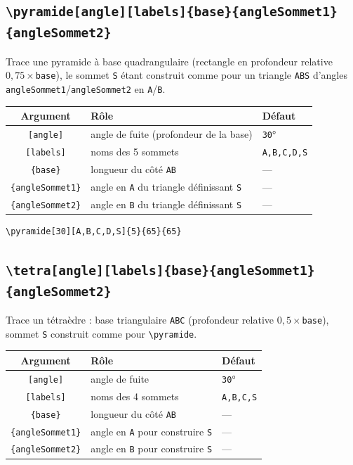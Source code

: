 \documentclass[11pt,a4paper]{article}
\newcommand{\cmdname}[1]{\texttt{\textbackslash#1}}
\begin{document}
\subsection{\cmdname{pyramide[angle][labels]\{base\}\{angleSommet1\}\{angleSommet2\}}}

Trace une pyramide à base quadrangulaire (rectangle en profondeur relative $0{,}75\times$\texttt{base}), le sommet \texttt{S} étant construit comme pour un triangle \texttt{ABS} d'angles \texttt{angleSommet1}/\texttt{angleSommet2} en \texttt{A}/\texttt{B}.

\begin{center}
\begin{tabular}{@{}cll@{}}
\toprule
\textbf{Argument} & \textbf{Rôle} & \textbf{Défaut} \\
\midrule
\texttt{[angle]} & angle de fuite (profondeur de la base) & \texttt{30}° \\
\texttt{[labels]} & noms des 5 sommets & \texttt{A,B,C,D,S} \\
\texttt{\{base\}} & longueur du côté \texttt{AB} & --- \\
\texttt{\{angleSommet1\}} & angle en \texttt{A} du triangle définissant \texttt{S} & --- \\
\texttt{\{angleSommet2\}} & angle en \texttt{B} du triangle définissant \texttt{S} & --- \\
\bottomrule
\end{tabular}
\end{center}

\begin{lstlisting}
\pyramide[30][A,B,C,D,S]{5}{65}{65}
\end{lstlisting}

\subsection{\cmdname{tetra[angle][labels]\{base\}\{angleSommet1\}\{angleSommet2\}}}

Trace un tétraèdre : base triangulaire \texttt{ABC} (profondeur relative $0{,}5\times$\texttt{base}), sommet \texttt{S} construit comme pour \cmdname{pyramide}.

\begin{center}
\begin{tabular}{@{}cll@{}}
\toprule
\textbf{Argument} & \textbf{Rôle} & \textbf{Défaut} \\
\midrule
\texttt{[angle]} & angle de fuite & \texttt{30}° \\
\texttt{[labels]} & noms des 4 sommets & \texttt{A,B,C,S} \\
\texttt{\{base\}} & longueur du côté \texttt{AB} & --- \\
\texttt{\{angleSommet1\}} & angle en \texttt{A} pour construire \texttt{S} & --- \\
\texttt{\{angleSommet2\}} & angle en \texttt{B} pour construire \texttt{S} & --- \\
\bottomrule
\end{tabular}
\end{center}
\end{document}

